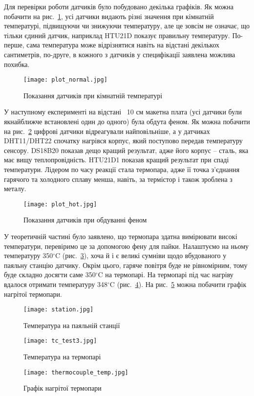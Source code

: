 Для перевірки роботи датчиків було побудовано декілька графіків. Як можна побачити на рис.~\ref{fig:plot_normal}, усі датчики видають різні значення при кімнатній температурі, підвищуючи чи знижуючи температуру, але це зовсім не означає, що тільки єдиний датчик, наприклад HTU21D показує правильну температуру. По-перше, сама температура може відрізнятися навіть на відстані декількох сантиметрів, по-друге, в кожного з датчиків у специфікації заявлена можлива похибка.

\begin{figure}[ht]
    \centering
    \texttt{[image: plot\_normal.jpg]}
    \caption{Показання датчиків при кімнатній температурі}
    \label{fig:plot_normal}
\end{figure}

У наступному експерименті на відстані ~10 см макетна плата (усі датчики були якнайближче встановлені один до одного) була обдута феном. Як можна побачити на рис.~\ref{fig:plot_hot} цифрові датчики відреагували найповільніше, а у датчиках DHT11/DHT22 спочатку нагрівся корпус, який поступово передав температуру сенсору. DS18B20 показав дещо кращий результат, адже його корпус -- сталь, яка має вищу теплопровідність. HTU21D1 показав кращий результат при спаді температури. Лідером по часу реакції стала термопара, адже її точка з'єднання гарячого та холодного сплаву менша, навіть, за термістор і також зроблена з металу.

\begin{figure}[H]
    \centering
    \texttt{[image: plot\_hot.jpg]}
    \caption{Показання датчиків при обдуванні феном}
    \label{fig:plot_hot}
\end{figure}

У теоретичній частині було заявлено, що термопара здатна вимірювати високі температури, перевіримо це за допомогою фену для пайки. Налаштуємо на ньому температуру 350$^\circ$C (рис.~\ref{fig:station}), хоча й і є великі сумніви щодо вбудованого у паяльну станцію датчику. Окрім цього, гаряче повітря буде не рівномірним, тому буде складно досягти саме 350$^\circ$C на термопарі. На термопарі під час нагріву вдалося отримати температуру 348$^\circ$C (рис.~\ref{fig:tc_test3}). На рис.~\ref{fig:plot_station} можна побачити графік нагрітої термопари.

\begin{figure}[ht]
    \centering
    \texttt{[image: station.jpg]}
    \caption{Температура на паяльній станції}
    \label{fig:station}
\end{figure}

\begin{figure}[ht]
    \centering
    \texttt{[image: tc\_test3.jpg]}
    \caption{Температура на термопарі}
    \label{fig:tc_test3}
    \vspace*{-3em}
\end{figure}

\begin{figure}[ht]
    \centering
    \texttt{[image: thermocouple\_temp.jpg]}
    \caption{Графік нагрітої термопари}
    \label{fig:plot_station}
\end{figure}
